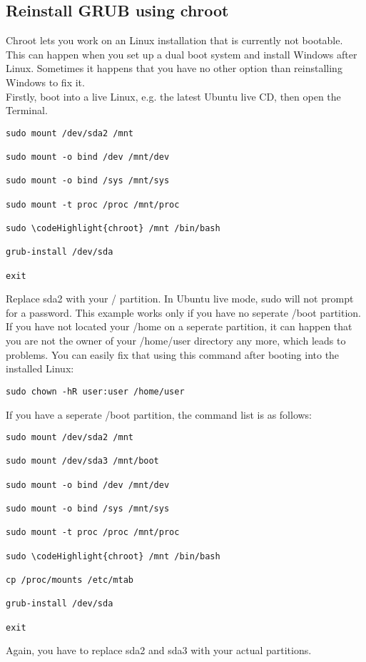 \documentclass[12pt,a4paper]{article}
\begin{document}
\subsection{Reinstall GRUB using chroot}
Chroot lets you work on an Linux installation that is currently not bootable. This can happen when you set up a dual boot system and install Windows after Linux. Sometimes it happens that you have no other option than reinstalling Windows to fix it. \\ Firstly, boot into a live Linux, e.g. the latest Ubuntu live CD, then open the Terminal.
\begin{Verbatim}[commandchars=\\\{\}]
sudo mount /dev/sda2 /mnt 

sudo mount -o bind /dev /mnt/dev
 
sudo mount -o bind /sys /mnt/sys 

sudo mount -t proc /proc /mnt/proc
 
sudo \codeHighlight{chroot} /mnt /bin/bash
 
grub-install /dev/sda 

exit
\end{Verbatim}
Replace sda2 with your / partition. In Ubuntu live mode, sudo will not prompt for a password. This example works only if you have no seperate /boot partition. If you have not located your /home on a seperate partition, it can happen that you are not the owner of your /home/user directory any more, which leads to problems. You can easily fix that using this command after booting into the installed Linux:
\begin{Verbatim}
sudo chown -hR user:user /home/user
\end{Verbatim}
If you have a seperate /boot partition, the command list is as follows:
\begin{Verbatim}
sudo mount /dev/sda2 /mnt

sudo mount /dev/sda3 /mnt/boot 

sudo mount -o bind /dev /mnt/dev

sudo mount -o bind /sys /mnt/sys

sudo mount -t proc /proc /mnt/proc

sudo \codeHighlight{chroot} /mnt /bin/bash

cp /proc/mounts /etc/mtab

grub-install /dev/sda

exit 
\end{Verbatim}
Again, you have to replace sda2 and sda3 with your actual partitions. 
\end{document}
